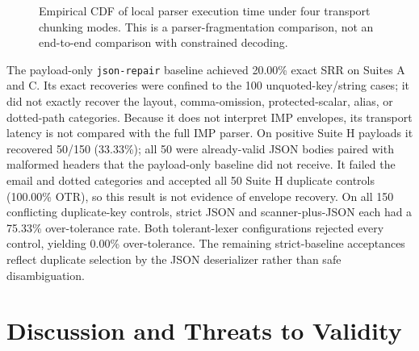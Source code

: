 \documentclass[conference]{IEEEtran}
\begin{document}
\begin{figure}[t]
\caption{Empirical CDF of local parser execution time under four transport
chunking modes. This is a parser-fragmentation comparison, not an
end-to-end comparison with constrained decoding.}
\label{fig:transport-cdf}
\end{figure}

The payload-only \texttt{json-repair} baseline achieved 20.00\% exact SRR
on Suites A and C. Its exact recoveries were confined to the 100
unquoted-key/string cases; it did not exactly recover the layout,
comma-omission, protected-scalar, alias, or dotted-path categories. Because it
does not interpret IMP envelopes, its transport latency is not compared with
the full IMP parser. On positive Suite H payloads it recovered 50/150
(33.33\%); all 50 were already-valid JSON bodies paired with malformed headers
that the payload-only baseline did not receive. It failed the email and dotted
categories and accepted all 50 Suite H duplicate controls (100.00\% OTR), so
this result is not evidence of envelope recovery. On all 150 conflicting
duplicate-key controls, strict
JSON and scanner-plus-JSON each had a 75.33\% over-tolerance rate. Both
tolerant-lexer configurations rejected every control, yielding 0.00\%
over-tolerance. The remaining strict-baseline acceptances reflect duplicate
selection by the JSON deserializer rather than safe disambiguation.

\section{Discussion and Threats to Validity}
\end{document}
